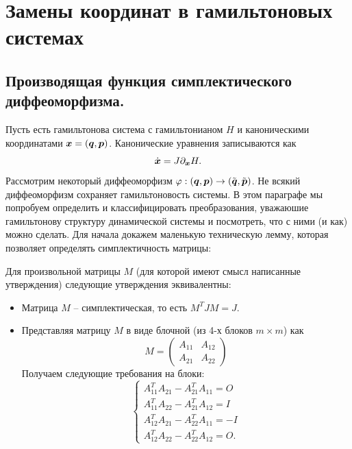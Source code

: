 \section{Замены координат в гамильтоновых системах}
\subsection{Производящая функция симплектического диффеоморфизма.}
Пусть есть гамильтонова система с гамильтонианом $H$ и каноническими координатами $\boldsymbol{x} = (\boldsymbol{q}, \boldsymbol{p})$.
Канонические уравнения записываются как
\[
    \dot{\boldsymbol{x}} = J\partial_{\boldsymbol{x}} H.
\]
Рассмотрим некоторый диффеоморфизм $\varphi: (\boldsymbol{q}, \boldsymbol{p}) \to (\tilde{\boldsymbol{q}}, \tilde{\boldsymbol{p}})$.
Не всякий диффеоморфизм сохраняет гамильтоновость системы.
В этом параграфе мы попробуем определить и классифицировать преобразования, уважаюшие гамильтонову структуру динамической системы и посмотреть, что с ними (и как) можно сделать.
Для начала докажем маленькую техническую лемму, которая позволяет определять симплектичность матрицы:
\begin{lemma}
    Для произвольной матрицы $M$ (для которой имеют смысл написанные утверждения) следующие утверждения эквивалентны:
    \begin{itemize}
        \item Матрица $M$ -- симплектическая, то есть $M^T J M = J$.
        \item Представляя матрицу $M$ в виде блочной (из 4-х блоков $m \times m$) как
        \[
            M = \begin{pmatrix*} A_{11} & A_{12} \\ A_{21} & A_{22}
            \end{pmatrix*}
        \]
        Получаем следующие требования на блоки:
        \[
            \begin{cases}
                A_{11}^T A_{21} - A_{21}^T A_{11} = O \\
                A_{11}^T A_{22} - A^T_{21}A_{12} = I \\
                A^T_{12} A_{21} - A^T_{22} A_{11} = -I \\
                A^T_{12} A_{22} - A^T_{22} A_{12} = O.
            \end{cases}
        \]
    \end{itemize}
\end{lemma}
